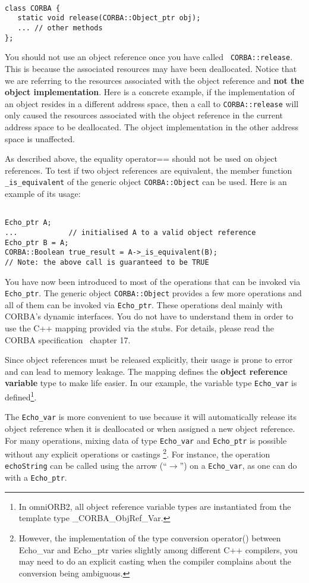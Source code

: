 \documentclass[11pt,twoside,onecolumn]{book}
\begin{document}
{\small
\begin{verbatim}

class CORBA {
   static void release(CORBA::Object_ptr obj);
   ... // other methods
};
\end{verbatim}
}

You should not use an object reference once you have called {\tt
CORBA::release}. This is because the associated resources may have been
deallocated. Notice that we are referring to the resources associated with
the object reference and {\bf not the object implementation}. Here is a
concrete example, if the implementation of an object resides in a different
address space, then a call to {\tt CORBA::release} will only caused the
resources associated with the object reference in the current address space
to be deallocated. The object implementation in the other address space is
unaffected.

As described above, the equality operator== should not be used on object
references. To test if two object references are equivalent, the member
function {\tt \_is\_equivalent} of the generic object {\tt CORBA::Object}
can be used. Here is an example of its usage:

{\small
\begin{verbatim}

Echo_ptr A;
...            // initialised A to a valid object reference 
Echo_ptr B = A;
CORBA::Boolean true_result = A->_is_equivalent(B); 
// Note: the above call is guaranteed to be TRUE

\end{verbatim}
}

You have now been introduced to most of the operations that can be invoked
via {\tt Echo\_ptr}. The generic object {\tt CORBA::Object} provides a few more
operations and all of them can be invoked via {\tt Echo\_ptr}. These operations
deal mainly with CORBA's dynamic interfaces. You do not have to understand
them in order to use the C++ mapping provided via the stubs. For details,
please read the CORBA specification~\cite{corba2-spec} chapter 17.

Since object references must be released explicitly, their usage is prone
to error and can lead to memory leakage. The mapping defines the {\bf
object reference variable} type to make life easier. In our example, the
variable type {\tt Echo\_var} is defined\footnote{In omniORB2, all object
reference variable types are instantiated from the template type
\_CORBA\_ObjRef\_Var.}.

The {\tt Echo\_var} is more convenient to use because it will automatically
release its object reference when it is deallocated or when assigned a new
object reference. For many operations, mixing data of type {\tt Echo\_var} and
{\tt Echo\_ptr} is possible without any explicit operations or castings
\footnote{However, the implementation of the type conversion operator()
between Echo\_var and Echo\_ptr varies slightly among different C++
compilers, you may need to do an explicit casting when the compiler
complains about the conversion being ambiguous.}. For instance, the
operation {\tt echoString} can be called using the arrow
(``$\rightarrow$'') on a {\tt Echo\_var}, as one can do with a {\tt Echo\_ptr}.
\end{document}
